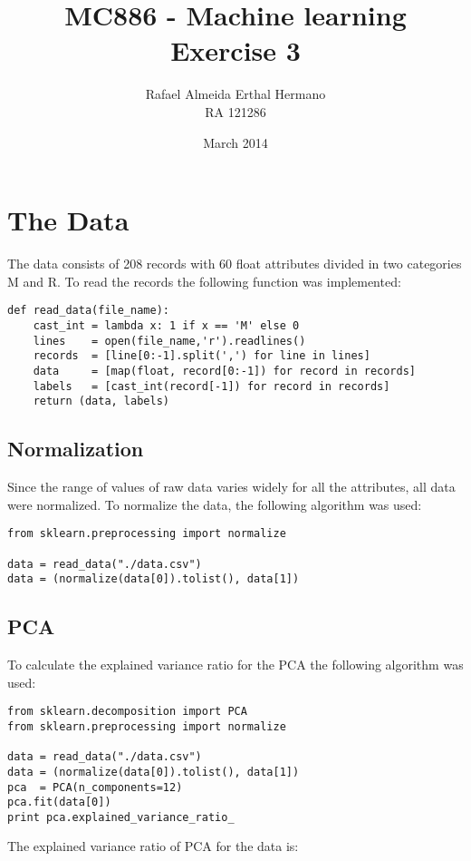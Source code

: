 \documentclass{article}
\title{MC886 - Machine learning \\ Exercise 3}
\author{Rafael Almeida Erthal Hermano\\RA 121286}
\date{March 2014}
\begin{document}
\maketitle
\newpage

\section{The Data}
The data consists of 208 records with 60 float attributes divided in two categories M and R. To read the records the following function was implemented:

\begin{lstlisting}
def read_data(file_name):
    cast_int = lambda x: 1 if x == 'M' else 0
    lines    = open(file_name,'r').readlines()
    records  = [line[0:-1].split(',') for line in lines]
    data     = [map(float, record[0:-1]) for record in records]
    labels   = [cast_int(record[-1]) for record in records]
    return (data, labels)
\end{lstlisting}

\subsection{Normalization}
Since the range of values of raw data varies widely for all the attributes, all data were normalized. To normalize the data, the following algorithm was used:

\begin{lstlisting}
from sklearn.preprocessing import normalize

data = read_data("./data.csv")
data = (normalize(data[0]).tolist(), data[1])
\end{lstlisting}

\subsection{PCA}
To calculate the explained variance ratio for the PCA the following algorithm was used:

\begin{lstlisting}
from sklearn.decomposition import PCA
from sklearn.preprocessing import normalize

data = read_data("./data.csv")
data = (normalize(data[0]).tolist(), data[1])
pca  = PCA(n_components=12)
pca.fit(data[0])
print pca.explained_variance_ratio_
\end{lstlisting}

The explained variance ratio of PCA for the data is:
\end{document}
